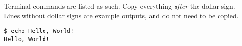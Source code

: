 Terminal commands are listed as such. Copy everything \textit{after} the dollar sign. Lines without dollar signs are example outputs, and do not need to be copied.
			
\begin{lstlisting}
$ echo Hello, World!
Hello, World!
\end{lstlisting}